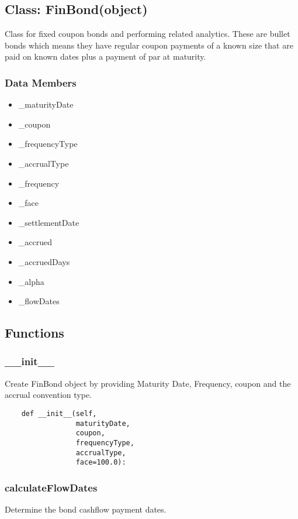 \documentclass[twoside,11pt]{book}
\begin{document}
\subsection*{Class: FinBond(object)}
Class for fixed coupon bonds and performing related analytics. These are bullet bonds which means they have regular coupon payments of a known size that are paid on known dates plus a payment of par at maturity. 

\subsubsection*{Data Members}
\begin{itemize}
\item{\_maturityDate}
\item{\_coupon}
\item{\_frequencyType}
\item{\_accrualType}
\item{\_frequency}
\item{\_face}
\item{\_settlementDate}
\item{\_accrued}
\item{\_accruedDays}
\item{\_alpha}
\item{\_flowDates}
\end{itemize}

\subsection*{Functions}

\subsubsection*{{\bf \_\_init\_\_}}
Create FinBond object by providing Maturity Date, Frequency, coupon and the accrual convention type.  

\begin{lstlisting}
    def __init__(self,
                 maturityDate,
                 coupon,
                 frequencyType,
                 accrualType,
                 face=100.0):
\end{lstlisting}

\subsubsection*{{\bf calculateFlowDates}}
Determine the bond cashflow payment dates.  
\end{document}
